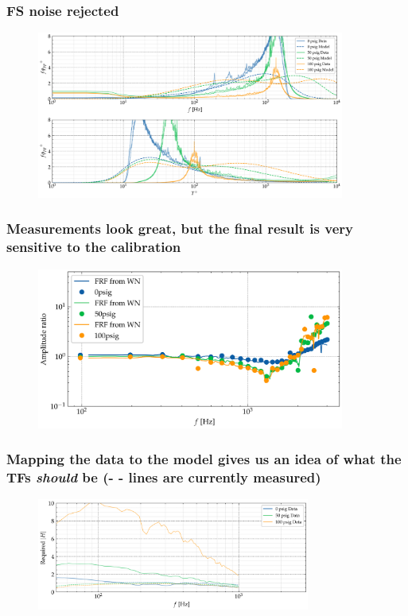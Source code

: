 \documentclass[aspectratio=169,9pt]{beamer}
\begin{document}
\begin{frame}
  \frametitle{FS noise rejected}
  \begin{figure}
      \centering
      \includegraphics[width=0.9\textwidth]{final/spectra_comparison.png}
  \end{figure}
\end{frame}

\begin{frame}
  \frametitle{Measurements look great, but the final result is very sensitive to the calibration}
  \begin{figure}
      \centering
      \includegraphics[width=0.9\textwidth]{tonal_ratios/all_tonal_pressures.png}
  \end{figure}
\end{frame}

\begin{frame}
  \frametitle{Mapping the data to the model gives us an idea of what the TFs \emph{should} be (- - lines are currently measured)}
  \begin{figure}
      \centering
      \includegraphics[width=0.8\textwidth]{tonal_ratios/ratio.png}
  \end{figure}
\end{frame}
\end{document}

